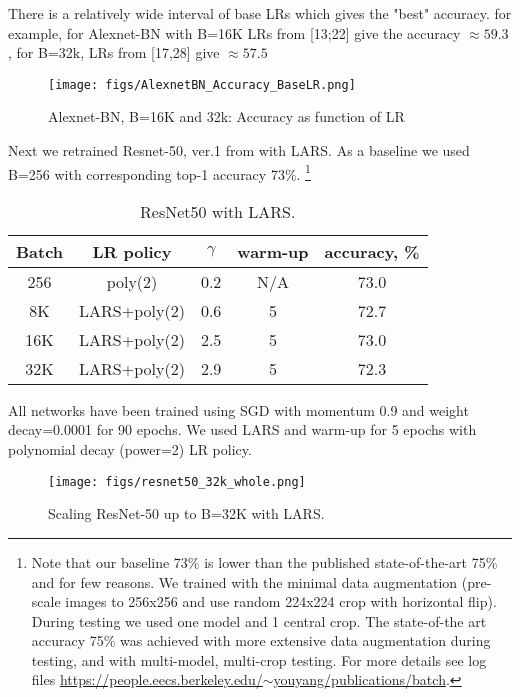 \documentclass{article} %
\begin{document}
There is a relatively wide interval of base LRs which  gives the "best" accuracy. for example, for Alexnet-BN with B=16K LRs from [13;22] give the  accuracy $\approx 59.3$, for B=32k, LRs from [17,28] give  $\approx 57.5$
\begin{figure*}[htb!]
\centering
\texttt{[image: figs/AlexnetBN\_Accuracy\_BaseLR.png]}
\caption{Alexnet-BN, B=16K and 32k: Accuracy as function of LR}
\label{fig:alexnetbn_acc_baselr}
\vspace{-10pt}
\end{figure*}


Next we retrained Resnet-50, ver.1 from \cite{he2016deep} with LARS. As a baseline we used B=256 with corresponding top-1 accuracy 73\%. 
\footnote {
Note that our baseline 73\% is lower than the published state-of-the-art 75\% \cite{goyal2017accurate} and \cite{Cho2017poweraiddl} for few reasons. We trained with the minimal data augmentation (pre-scale images to 256x256 and use random 224x224 crop with horizontal flip). During testing we used one model and 1 central crop. The state-of-the art accuracy 75\% was achieved with more extensive data augmentation during testing, and with multi-model, multi-crop testing. For more details see log files  \href{https://people.eecs.berkeley.edu/~youyang/publications/batch}{https://people.eecs.berkeley.edu/$\sim$youyang/publications/batch}.
}

\begin{table}[htb!]
  \caption{ResNet50 with LARS.}
  \label{tab:resnet50_auto_lr}
  \centering
  \vspace{3pt}
  \begin{tabular}{|c|c|c|c|c|}
    \hline
    Batch      & LR policy    &  $\gamma$ & warm-up & accuracy, \% \\
    \hline 256 &      poly(2) &      0.2     & N/A & 73.0 \\
    \hline
    \hline  8K & LARS+poly(2) &      0.6     & 5 & 72.7 \\
    \hline 16K & LARS+poly(2) &      2.5     & 5 & 73.0 \\
    \hline 32K & LARS+poly(2) &      2.9     & 5 & 72.3 \\
    \hline
  \end{tabular}
\end{table}
All networks have been trained using SGD with momentum 0.9 and weight decay=0.0001 for 90 epochs. We used LARS and warm-up for 5 epochs with polynomial decay (power=2) LR policy.
\begin{figure*}[tb]
 \vspace{5pt}
 \centering
 \texttt{[image: figs/resnet50\_32k\_whole.png]}
 \caption{\label{fig:resnet50_32k}Scaling ResNet-50 up to B=32K with LARS.}
 \vspace{-10pt}
\end{figure*}
\end{document}
